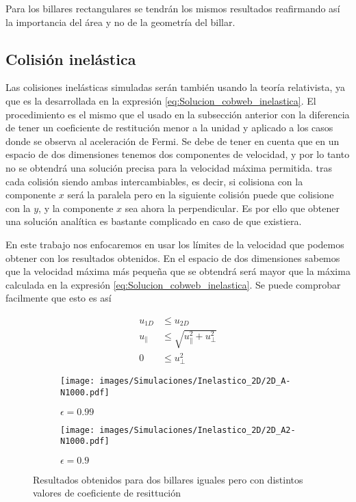 Para los billares rectangulares se tendrán los mismos resultados reafirmando así la importancia del área y no de la geometría del billar. 

\newpage

\subsection{Colisión inelástica}

Las colisiones inelásticas simuladas serán también usando la teoría relativista, ya que es la desarrollada en la expresión \ref{eq:Solucion_cobweb_inelastica}. El procedimiento es el mismo que el usado en la subsección anterior con la diferencia de tener un coeficiente de restitución menor a la unidad y aplicado a los casos donde se observa al aceleración de Fermi. Se debe de tener en cuenta que en un espacio de dos dimensiones tenemos dos componentes de velocidad, y por lo tanto no se obtendrá una solución precisa para la velocidad máxima permitida.  tras cada colisión siendo ambas intercambiables, es decir, si colisiona con la componente \( x \) será la paralela pero en la siguiente colisión puede que colisione con la \( y \), y la componente \( x \) sea ahora la perpendicular. Es por ello que obtener una solución analítica es bastante complicado en caso de que existiera. 

\vspace{3mm}

En este trabajo nos enfocaremos en usar los límites de la velocidad que podemos obtener con los resultados obtenidos. En el espacio de dos dimensiones sabemos que la velocidad máxima más pequeña que se obtendrá será mayor que la máxima calculada en la expresión \ref{eq:Solucion_cobweb_inelastica}. Se puede comprobar facilmente que esto es así

\begin{align}
    u_{1D} &\leq u_{2D} \nonumber\\
    u_{\parallel} &\leq \sqrt{u_\parallel^2 + u_\perp^2}\\
     0 &\leq u_\perp^2 \nonumber
\end{align}

\begin{figure}[!h]
    \begin{subfigure}[b]{0.5\textwidth}
        \centering
        \texttt{[image: images/Simulaciones/Inelastico\_2D/2D\_A-N1000.pdf]}
        \caption{\( \epsilon = 0.99 \)}
    \end{subfigure}
    \hfill
    \begin{subfigure}[b]{0.5\textwidth}
        \centering
        \texttt{[image: images/Simulaciones/Inelastico\_2D/2D\_A2-N1000.pdf]}
        \caption{\( \epsilon = 0.9 \)}
    \end{subfigure}
    \caption{Resultados obtenidos para dos billares iguales pero con distintos valores de coeficiente de resittución}
    \label{fig:2DR_A-N1000_Ine}
\end{figure}

